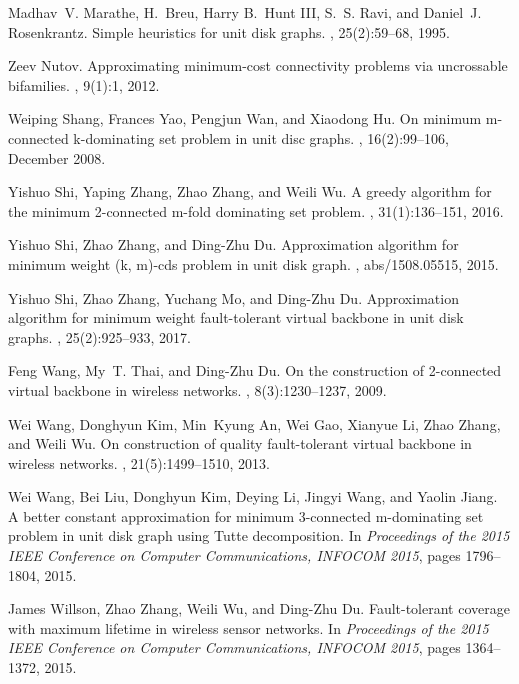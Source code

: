 \documentclass[11pt]{article}
\begin{document}
\begin{thebibliography}{10}
Madhav~V. Marathe, H.~Breu, Harry B.~Hunt {III}, S.~S. Ravi, and Daniel~J.
  Rosenkrantz.
\newblock Simple heuristics for unit disk graphs.
, 25(2):59--68, 1995.

Zeev Nutov.
\newblock Approximating minimum-cost connectivity problems via uncrossable
  bifamilies.
, 9(1):1, 2012.

Weiping Shang, Frances Yao, Pengjun Wan, and Xiaodong Hu.
\newblock On minimum m-connected k-dominating set problem in unit disc graphs.
, 16(2):99--106, December
  2008.

Yishuo Shi, Yaping Zhang, Zhao Zhang, and Weili Wu.
\newblock A greedy algorithm for the minimum 2-connected m-fold dominating set
  problem.
, 31(1):136--151, 2016.

Yishuo Shi, Zhao Zhang, and Ding{-}Zhu Du.
\newblock Approximation algorithm for minimum weight (k, m)-cds problem in unit
  disk graph.
, abs/1508.05515, 2015.

Yishuo Shi, Zhao Zhang, Yuchang Mo, and Ding{-}Zhu Du.
\newblock Approximation algorithm for minimum weight fault-tolerant virtual
  backbone in unit disk graphs.
, 25(2):925--933, 2017.

Feng Wang, My~T. Thai, and Ding{-}Zhu Du.
\newblock On the construction of 2-connected virtual backbone in wireless
  networks.
,
  8(3):1230--1237, 2009.

Wei Wang, Donghyun Kim, Min~Kyung An, Wei Gao, Xianyue Li, Zhao Zhang, and
  Weili Wu.
\newblock On construction of quality fault-tolerant virtual backbone in
  wireless networks.
, 21(5):1499--1510, 2013.

Wei Wang, Bei Liu, Donghyun Kim, Deying Li, Jingyi Wang, and Yaolin Jiang.
\newblock A better constant approximation for minimum 3-connected m-dominating
  set problem in unit disk graph using {T}utte decomposition.
\newblock In {\em Proceedings of the 2015 {IEEE} Conference on Computer
  Communications, {INFOCOM} 2015}, pages 1796--1804, 2015.

James Willson, Zhao Zhang, Weili Wu, and Ding{-}Zhu Du.
\newblock Fault-tolerant coverage with maximum lifetime in wireless sensor
  networks.
\newblock In {\em Proceedings of the 2015 {IEEE} Conference on Computer
  Communications, {INFOCOM} 2015}, pages 1364--1372, 2015.


\end{thebibliography}
\end{document}
